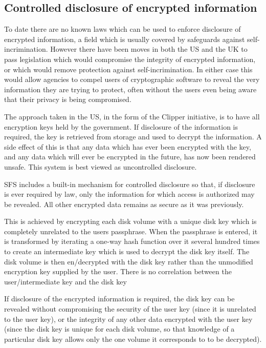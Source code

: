 \subsection{Controlled disclosure of encrypted information}

To date there are no known laws which can be used to enforce disclosure of
encrypted information, a field which is usually covered by safeguards against
self-incrimination.  However there have been moves in both the US and the UK to
pass legislation which would compromise the integrity of encrypted information,
or which would remove protection against self-incrimination.  In either case
this would allow agencies to compel users of cryptographic software to reveal
the very information they are trying to protect, often without the users even
being aware that their privacy is being compromised.

The approach taken in the US, in the form of the Clipper initiative, is to have
all encryption keys held by the government.  If disclosure of the information
is required, the key is retrieved from storage and used to decrypt the
information.  A side effect of this is that any data which has ever been
encrypted with the key, and any data which will ever be encrypted in the 
future, has now been rendered unsafe.  This system is best viewed as 
uncontrolled disclosure.

SFS includes a built-in mechanism for controlled disclosure so that, if
disclosure is ever required by law, only the information for which access is
authorized may be revealed.  All other encrypted data remains as secure as it
was previously.

This is achieved by encrypting each disk volume with a unique disk key which is
completely unrelated to the users passphrase.  When the passphrase is entered,
it is transformed by iterating a one-way hash function over it several hundred
times to create an intermediate key which is used to decrypt the disk key
itself.  The disk volume is then en/decrypted with the disk key rather than the
unmodified encryption key supplied by the user.  There is no correlation
between the user/intermediate key and the disk key

If disclosure of the encrypted information is required, the disk key can be
revealed without compromising the security of the user key (since it is
unrelated to the user key), or the integrity of any other data encrypted with
the user key (since the disk key is unique for each disk volume, so that
knowledge of a particular disk key allows only the one volume it corresponds to
to be decrypted).

